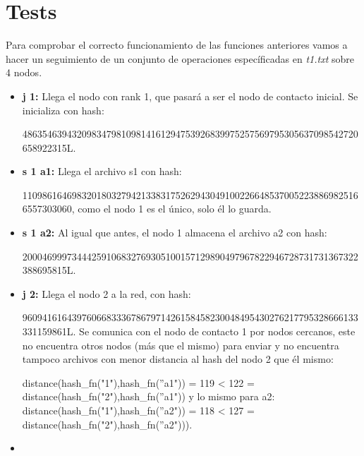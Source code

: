 \section{Tests}

Para comprobar el correcto funcionamiento de las funciones anteriores vamos a hacer un seguimiento de un conjunto de operaciones específicadas en \emph{t1.txt} sobre 4 nodos.

\begin{itemize}
        \item \textbf{j 1:} Llega el nodo con rank 1, que pasará a ser el nodo de contacto inicial. Se inicializa con hash:

        48635463943209834798109814161294753926839975257569795305637098542720658922315L.
        \item \textbf{s 1 a1:} Llega el archivo s1 con hash:

        110986164698320180327942133831752629430491002266485370052238869825166557303060, como el nodo 1 es el único, solo él lo guarda.
        \item \textbf{s 1 a2:} Al igual que antes, el nodo 1 almacena el archivo a2 con hash:

        20004699973444259106832769305100157129890497967822946728731731367322388695815L.
        \item \textbf{j 2:} Llega el nodo 2 a la red, con hash:

        96094161643976066833367867971426158458230048495430276217795328666133331159861L. Se comunica con el nodo de contacto 1 por nodos cercanos, este no encuentra otros nodos (más que el mismo) para enviar y no encuentra tampoco archivos con menor distancia al hash del nodo 2 que él mismo:
        
        distance(hash\_fn("1"),hash\_fn(''a1")) = 119 < 122 = distance(hash\_fn("2"),hash\_fn(''a1")) y lo mismo para a2:
        distance(hash\_fn("1"),hash\_fn(''a2")) = 118 < 127 = distance(hash\_fn("2"),hash\_fn(''a2"))).
        \item \textbf{}

\end{itemize}
